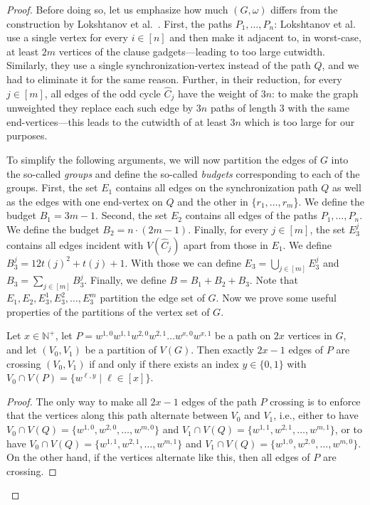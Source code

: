 \documentclass[a4paper,UKenglish,cleveref, autoref, thm-restate]{lipics-v2021}
\begin{document}
\begin{proof}
    Before doing so, let us emphasize how much $(G, \omega)$ differs from the construction by Lokshtanov et al.~\cite{DBLP:journals/talg/LokshtanovMS18}.
    First, the paths $P_1, \dots, P_n$: Lokshtanov et al. use a single vertex for every $i \in [n]$ and then make it adjacent to, in worst-case, at least $2m$ vertices of the clause gadgets---leading to too large cutwidth.
    Similarly, they use a single synchronization-vertex instead of the path $Q$, and we had to eliminate it for the same reason.
    Further, in their reduction, for every $j \in [m]$, all edges of the odd cycle $\hat{C}_j$ have the weight of $3n$: to make the graph unweighted they replace each such edge by $3n$ paths of length $3$ with the same end-vertices---this leads to the cutwidth of at least $3n$ which is too large for our purposes. 
    
    To simplify the following arguments, we will now partition the edges of $G$ into the so-called \emph{groups} and define the so-called \emph{budgets} corresponding to each of the groups. 
    First, the set $E_1$ contains all edges on the synchronization path $Q$ as well as the edges with one end-vertex on $Q$ and the other in $\{r_1, \dots, r_m$\}.
    We define the budget $B_1 = 3m-1$.
    Second, the set $E_2$ contains all edges of the paths $P_1, \dots, P_n$.
    We define the budget $B_2 = n \cdot (2m-1)$. 
    Finally, for every $j \in [m]$, the set $E^j_3$ contains 
    all edges incident with $V(\hat C_j)$ apart from those in $E_1$.
    We define $B^j_3 = 12t(j)^2 + t(j) + 1$.
    With those we can define $E_3 = \bigcup_{j \in [m]} E_3^j$ and $B_3 = \sum_{j \in [m]} B_3^j$.
    Finally, we define $B = B_1 + B_2 + B_3$.
    Note that $E_1, E_2, E_3^1, E_3^2, \dots, E_3^m$ partition the edge set of $G$.
    Now we prove some useful properties of the partitions of the vertex set of $G$.

    \begin{observation}\label{obs:crossing-path}
        Let $x \in \mathbb{N}^+$, let $P = w^{1,0} w^{1,1} w^{2,0} w^{2,1} \dots w^{x,0} w^{x,1}$ be a path on $2x$ vertices in $G$, and let $(V_0, V_1)$ be a partition of $V(G)$.
        Then exactly $2x-1$ edges of $P$ are crossing $(V_0, V_1)$ if and only if there exists an index $y \in \{0, 1\}$ with $V_0 \cap V(P) = \{w^{\ell, y} \mid \ell \in [x]\}$.
    \end{observation}

    \begin{proof}
        The only way to make all $2x-1$ edges of the path $P$ crossing is to enforce that the vertices along this path alternate between $V_0$ and $V_1$, i.e., either to have $V_0 \cap V(Q) = \{w^{1,0}, w^{2,0}, \dots, w^{m,0}\}$ and $V_1 \cap V(Q) = \{w^{1,1}, w^{2,1}, \dots, w^{m,1}\}$, or to have $V_0 \cap V(Q) = \{w^{1,1}, w^{2,1}, \dots, w^{m,1}\}$ and $V_1 \cap V(Q) = \{w^{1,0}, w^{2,0}, \dots, w^{m,0}\}$.
        On the other hand, if the vertices alternate like this, then all edges of $P$ are crossing.
    \end{proof}    
    

\end{proof}
\end{document}
